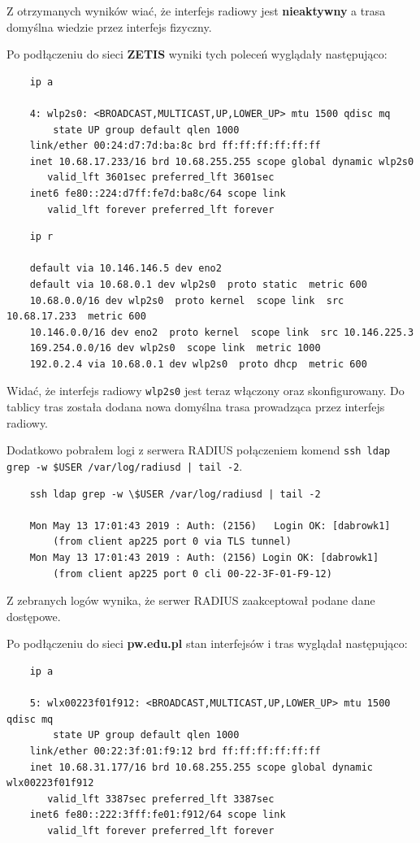 \documentclass{article} %
\begin{document}
Z otrzymanych wyników wiać, że interfejs radiowy jest \textbf{nieaktywny} a trasa domyślna wiedzie przez interfejs fizyczny.
\vspace{5 mm}

Po podłączeniu do sieci \textbf{ZETIS} wyniki tych poleceń wyglądały następująco:
\begin{lstlisting}
    ip a

    4: wlp2s0: <BROADCAST,MULTICAST,UP,LOWER_UP> mtu 1500 qdisc mq
        state UP group default qlen 1000
    link/ether 00:24:d7:7d:ba:8c brd ff:ff:ff:ff:ff:ff
    inet 10.68.17.233/16 brd 10.68.255.255 scope global dynamic wlp2s0
       valid_lft 3601sec preferred_lft 3601sec
    inet6 fe80::224:d7ff:fe7d:ba8c/64 scope link 
       valid_lft forever preferred_lft forever
\end{lstlisting}

\begin{lstlisting}
    ip r 

    default via 10.146.146.5 dev eno2 
    default via 10.68.0.1 dev wlp2s0  proto static  metric 600 
    10.68.0.0/16 dev wlp2s0  proto kernel  scope link  src 10.68.17.233  metric 600 
    10.146.0.0/16 dev eno2  proto kernel  scope link  src 10.146.225.3 
    169.254.0.0/16 dev wlp2s0  scope link  metric 1000 
    192.0.2.4 via 10.68.0.1 dev wlp2s0  proto dhcp  metric 600 
\end{lstlisting}

Widać, że interfejs radiowy \texttt{wlp2s0} jest teraz włączony oraz skonfigurowany.
Do tablicy tras została dodana nowa domyślna trasa prowadząca przez interfejs radiowy.
\vspace{5 mm}

Dodatkowo pobrałem logi z serwera RADIUS połączeniem komend \texttt{ssh ldap grep -w \$USER /var/log/radiusd | tail -2}.
\begin{lstlisting}
    ssh ldap grep -w \$USER /var/log/radiusd | tail -2

    Mon May 13 17:01:43 2019 : Auth: (2156)   Login OK: [dabrowk1] 
        (from client ap225 port 0 via TLS tunnel)
    Mon May 13 17:01:43 2019 : Auth: (2156) Login OK: [dabrowk1]
        (from client ap225 port 0 cli 00-22-3F-01-F9-12)
\end{lstlisting}
Z zebranych logów wynika, że serwer RADIUS zaakceptował podane dane dostępowe.

Po podłączeniu do sieci \textbf{pw.edu.pl} stan interfejsów i tras wyglądał następująco:

\begin{lstlisting}
    ip a

    5: wlx00223f01f912: <BROADCAST,MULTICAST,UP,LOWER_UP> mtu 1500 qdisc mq
        state UP group default qlen 1000
    link/ether 00:22:3f:01:f9:12 brd ff:ff:ff:ff:ff:ff
    inet 10.68.31.177/16 brd 10.68.255.255 scope global dynamic wlx00223f01f912
       valid_lft 3387sec preferred_lft 3387sec
    inet6 fe80::222:3fff:fe01:f912/64 scope link 
       valid_lft forever preferred_lft forever
\end{lstlisting}
\end{document}
